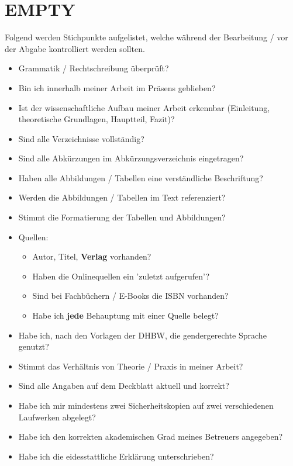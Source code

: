
\chapter{EMPTY}

Folgend werden Stichpunkte aufgelistet, welche während der Bearbeitung / vor der Abgabe kontrolliert werden sollten.

\begin{itemize}
    \item Grammatik / Rechtschreibung überprüft?
    \item Bin ich innerhalb meiner Arbeit im Präsens geblieben?
    \item Ist der wissenschaftliche Aufbau meiner Arbeit erkennbar (Einleitung, theoretische Grundlagen, Hauptteil, Fazit)?
    \item Sind alle Verzeichnisse vollständig?
    \item Sind alle Abkürzungen im Abkürzungsverzeichnis eingetragen?
    \item Haben alle Abbildungen / Tabellen eine verständliche Beschriftung?
    \item Werden die Abbildungen / Tabellen im Text referenziert?
    \item Stimmt die Formatierung der Tabellen und Abbildungen?
    \item Quellen:
    \begin{itemize}
        \item Autor, Titel, \textbf{Verlag} vorhanden?
        \item Haben die Onlinequellen ein 'zuletzt aufgerufen'?
        \item Sind bei Fachbüchern / E-Books die ISBN vorhanden?
        \item Habe ich \textbf{jede} Behauptung mit einer Quelle belegt?
    \end{itemize}
    \item Habe ich, nach den Vorlagen der DHBW, die gendergerechte Sprache genutzt?
    \item Stimmt das Verhältnis von Theorie / Praxis in meiner Arbeit?
    \item Sind alle Angaben auf dem Deckblatt aktuell und korrekt?
    \item Habe ich mir mindestens zwei Sicherheitskopien auf zwei verschiedenen Laufwerken abgelegt?
    \item Habe ich den korrekten akademischen Grad meines Betreuers angegeben?
    \item Habe ich die eidesstattliche Erklärung unterschrieben?

\end{itemize}